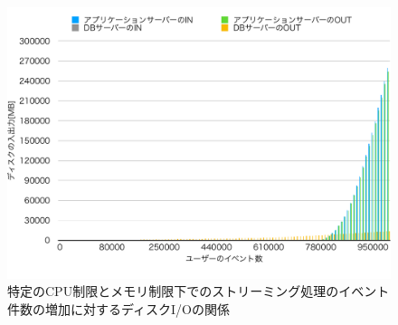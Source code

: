 \documentclass[../../../../../../main]{subfiles}
\begin{document}
    \begin{figure}[H]
        \centering
        \includegraphics[width=12cm]{graph}
        \caption{特定のCPU制限とメモリ制限下でのストリーミング処理のイベント件数の増加に対するディスクI/Oの関係}
        \label{fig:stream-disio-app_1_1024-db_1_1024}
    \end{figure}
\end{document}
